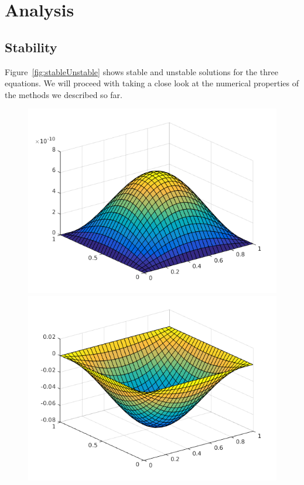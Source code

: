 \section{Analysis}
\subsection{Stability}
Figure~\ref{fig:stableUnstable} shows stable and unstable solutions for the three equations. We will proceed with taking a close look at the numerical properties of the methods we described so far. 
\begin{figure}
\includegraphics[scale = 0.33]{images/heat.png}
\includegraphics[scale = 0.33]{images/wave.png}

\end{figure}
